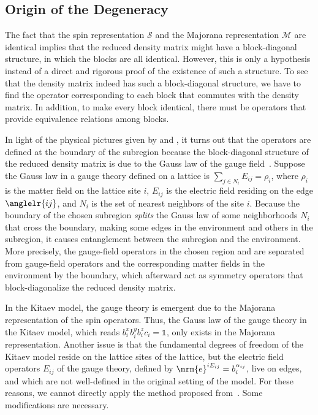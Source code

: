 \subsection{Origin of the Degeneracy}\label{sec:origin-of-degeneracy}
The fact that the spin representation $\mathcal{S}$ and the Majorana representation $\mathcal{M}$ are identical implies that the reduced density matrix might have a block-diagonal structure, in which the blocks are all identical. However, this is only a hypothesis instead of a direct and rigorous proof of the existence of such a structure. To see that the density matrix indeed has such a block-diagonal structure, we have to find the operator corresponding to each block that commutes with the density matrix. In addition, to make every block identical, there must be operators that provide equivalence relations among blocks.

In light of the physical pictures given by \cite{Yao-Qi} and \cite{PRX-ent-high}, it turns out that the operators are defined at the boundary of the subregion because the block-diagonal structure of the reduced density matrix is due to the Gauss law of the gauge field~\cite{PRX-ent-high}. Suppose the Gauss law in a gauge theory defined on a lattice is $\sum_{j\in N_i}E_{ij} = \rho_i$, where $\rho_i$ is the matter field on the lattice site $i$, $E_{ij}$ is the electric field residing on the edge $\anglelr{ij}$, and $N_i$ is the set of nearest neighbors of the site $i$. Because the boundary of the chosen subregion \textit{splits} the Gauss law of some neighborhoods $N_i$ that cross the boundary, making some edges in the environment and others in the subregion, it causes entanglement between the subregion and the environment. More precisely, the gauge-field operators in the chosen region and are separated from gauge-field operators and the corresponding matter fields in the environment by the boundary, which afterward act as symmetry operators that block-diagonalize the reduced density matrix. 

In the Kitaev model, the gauge theory is emergent due to the Majorana representation of the spin operators. Thus, the Gauss law of the gauge theory in the Kitaev model, which reads $b^x_ib^y_ib^z_ic_i = \mathds{1}$, only exists in the Majorana representation. Another issue is that the fundamental degrees of freedom of the Kitaev model reside on the lattice sites of the lattice, but the electric field operators $E_{ij}$ of the gauge theory, defined by $\mrm{e}^{i E_{ij}} = b^{\alpha_{ij}}_i$, live on edges, and which are not well-defined in the original setting of the model. For these reasons, we cannot directly apply the method proposed from~\cite{PRX-ent-high}. Some modifications are necessary.

